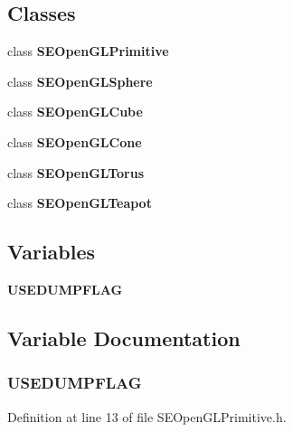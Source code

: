 \subsection*{Classes}
\begin{DoxyCompactItemize}
\item 
class {\bf S\+E\+Open\+G\+L\+Primitive}
\item 
class {\bf S\+E\+Open\+G\+L\+Sphere}
\item 
class {\bf S\+E\+Open\+G\+L\+Cube}
\item 
class {\bf S\+E\+Open\+G\+L\+Cone}
\item 
class {\bf S\+E\+Open\+G\+L\+Torus}
\item 
class {\bf S\+E\+Open\+G\+L\+Teapot}
\end{DoxyCompactItemize}
\subsection*{Variables}
\begin{DoxyCompactItemize}
\item 
{\bf U\+S\+E\+D\+U\+M\+P\+F\+L\+A\+G}
\end{DoxyCompactItemize}


\subsection{Variable Documentation}
\subsubsection[{U\+S\+E\+D\+U\+M\+P\+F\+L\+A\+G}]{\setlength{\rightskip}{0pt plus 5cm}U\+S\+E\+D\+U\+M\+P\+F\+L\+A\+G}\label{_s_e_open_g_l_primitive_8h_adf706a38197b60bc3bf6b16557554414}


Definition at line 13 of file S\+E\+Open\+G\+L\+Primitive.\+h.


